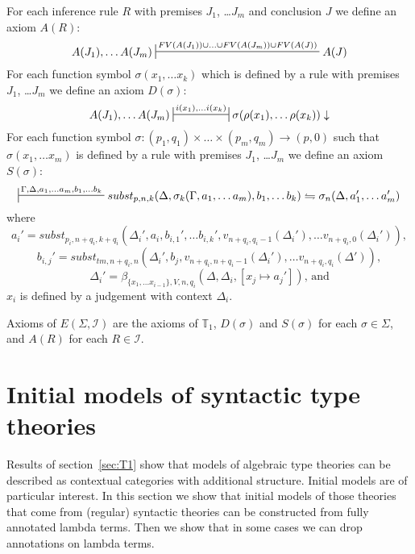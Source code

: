 \documentclass{amsart}
\theoremstyle{definition}
\theoremstyle{remark}
\numberwithin{figure}{section}
\begin{document}
For each inference rule $R$ with premises $J_1$, \ldots $J_m$ and conclusion $J$ we define an axiom $A(R)$:
\[ A(J_1), \ldots A(J_m) \sststile{}{FV(A(J_1)) \cup \ldots \cup FV(A(J_m)) \cup FV(A(J))} A(J) \]
For each function symbol $\sigma(x_1, \ldots x_k)$ which is defined by a rule with premises $J_1$, \ldots $J_m$ we define an axiom $D(\sigma)$:
\[ A(J_1), \ldots A(J_m) \ssststile{}{i(x_1), \ldots i(x_k)} \sigma(\rho(x_1), \ldots \rho(x_k)) \downarrow \]
For each function symbol $\sigma : (p_1,q_1) \times \ldots \times (p_m,q_m) \to (p,0)$ such that $\sigma(x_1, \ldots x_m)$ is defined by a rule with premises $J_1$, \ldots $J_m$ we define an axiom $S(\sigma)$:
\[ \sststile{}{\Gamma, \Delta, a_1, \ldots a_m, b_1, \ldots b_k} subst_{p,n,k}(\Delta, \sigma_k(\Gamma, a_1, \ldots a_m), b_1, \ldots b_k) \leftrightharpoons \sigma_n(\Delta, a_1', \ldots a_m') \]
where
\[ a_i' = subst_{p_i,n+q_i,k+q_i}(\Delta_i', a_i, b_{i,1}', \ldots b_{i,k}', v_{n+q_i,q_i-1}(\Delta_i'), \ldots v_{n+q_i,0}(\Delta_i')), \]
\[ b_{i,j}' = subst_{tm,n+q_i,n}(\Delta_i', b_j, v_{n+q_i,n+q_i-1}(\Delta_i'), \ldots v_{n+q_i,q_i}(\Delta')), \]
\[ \Delta_i' = \beta_{\{ x_1, \ldots x_{i-1} \},V,n,q_i}(\Delta, \Delta_i, [x_j \mapsto a_j']) \text{, and} \]
$x_i$ is defined by a judgement with context $\Delta_i$.

Axioms of $E(\Sigma, \mathcal{I})$ are the axioms of $\mathbb{T}_1$, $D(\sigma)$ and $S(\sigma)$ for each $\sigma \in \Sigma$, and $A(R)$ for each $R \in \mathcal{I}$.

\section{Initial models of syntactic type theories}

Results of section~\ref{sec:T1} show that models of algebraic type theories can be described as contextual categories with additional structure.
Initial models are of particular interest.
In this section we show that initial models of those theories that come from (regular) syntactic theories can be constructed from fully annotated lambda terms.
Then we show that in some cases we can drop annotations on lambda terms.



\end{document}
